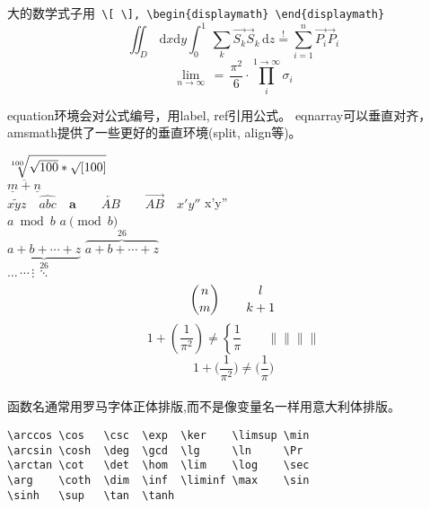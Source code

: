 \documentclass[12pt, a4paper, onecolumn, notitlepage]{article}
\begin{document}
\text{}

大的数学式子用\verb+ \[ \], \begin{displaymath} \end{displaymath}+\\
\[\iint_{D}\,\mathrm{d}x\mathrm{d}y\int_0^1\,\sum_k\vec {S_k}\vec S_k\,\mathrm{d}z\stackrel{!}{=}\sum_{i=1}^n\vec {P_i}{\vec P}_i\]
\begin{displaymath}
\lim_{n \to \infty}\,=\,\frac{\pi^2}{6}\cdot\prod_{i}^{1\rightarrow \infty}\sigma_i
\end{displaymath}

\text{}

equation环境会对公式编号，用label, ref引用公式。
eqnarray可以垂直对齐，amsmath提供了一些更好的垂直环境(split, align等)。

\text{}

$\sqrt[100]{\sqrt{100}*\surd[100]}$ \\[10pt]%
$\overline{\underline{m}+\underline{n}}$ \\
$\widetilde{xyz} \quad \widehat{abc} \quad \boldsymbol a \qquad \overleftarrow{AB} \qquad \overrightarrow{AB} \quad x'y''$ \quad x'y'' \\
$a\bmod b$ \qquad \qquad $a\pmod b$ \\
$\underbrace{ a+b+\cdots+z }_{26}$ \quad $\overbrace{ a+b+\cdots+z }^{26}$ \\
$\ldots\,\cdots\,\vdots\,\ddots$ \\

\[{n \choose m} \qquad {l \atop k+1}\]
\begin{displaymath}
1+\left(\frac{1}{\pi^2}\right)\neq\left\{\frac{1}{\pi}\right.\qquad\big\|\Big\|\bigg\|\Bigg\|
\end{displaymath}  
\begin{displaymath}
1+\big(\frac{1}{\pi^2}\Big)\neq\bigg(\frac{1}{\pi}\Bigg)
\end{displaymath}  
\\[30pt]

函数名通常用罗马字体正体排版,而不是像变量名一样用意大利体排版。
\begin{verbatim}
\arccos \cos   \csc  \exp  \ker    \limsup \min
\arcsin \cosh  \deg  \gcd  \lg     \ln     \Pr
\arctan \cot   \det  \hom  \lim    \log    \sec
\arg    \coth  \dim  \inf  \liminf \max    \sin
\sinh   \sup   \tan  \tanh 
\end{verbatim}
\end{document}
